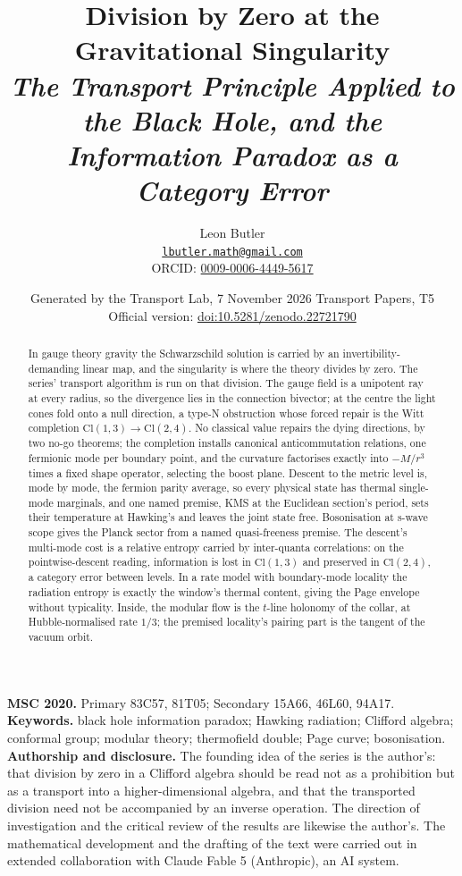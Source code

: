 \documentclass[11pt]{article}
\title{\bfseries Division by Zero at the Gravitational Singularity\\[4pt]\large\itshape The Transport Principle Applied to the Black Hole, and the Information Paradox as a Category Error}
\author{Leon Butler\\ \normalsize\href{mailto:lbutler.math@gmail.com}{\texttt{lbutler.math@gmail.com}}\\ \normalsize ORCID: \href{https://orcid.org/0009-0006-4449-5617}{0009-0006-4449-5617}}
\date{Generated by the Transport Lab, 7 November 2026 \textperiodcentered{} Transport Papers, T5\\[3pt]\small Official version: \href{https://doi.org/10.5281/zenodo.22721790}{doi:10.5281/zenodo.22721790}}
\theoremstyle{definition}
\theoremstyle{plain}
\providecommand{\Cl}{}\renewcommand{\Cl}{\mathrm{Cl}}
\begin{document}
\maketitle
\begin{abstract}
\normalsize
In gauge theory gravity the Schwarzschild solution is carried by an invertibility-demanding linear map, and the singularity is where the theory divides by zero. The series' transport algorithm is run on that division. The gauge field is a unipotent ray at every radius, so the divergence lies in the connection bivector; at the centre the light cones fold onto a null direction, a type-N obstruction whose forced repair is the Witt completion $\Cl(1,3) \to \Cl(2,4)$. No classical value repairs the dying directions, by two no-go theorems; the completion installs canonical anticommutation relations, one fermionic mode per boundary point, and the curvature factorises exactly into $-M/r^3$ times a fixed shape operator, selecting the boost plane. Descent to the metric level is, mode by mode, the fermion parity average, so every physical state has thermal single-mode marginals, and one named premise, KMS at the Euclidean section's period, sets their temperature at Hawking's and leaves the joint state free. Bosonisation at s-wave scope gives the Planck sector from a named quasi-freeness premise. The descent's multi-mode cost is a relative entropy carried by inter-quanta correlations: on the pointwise-descent reading, information is lost in $\Cl(1,3)$ and preserved in $\Cl(2,4)$, a category error between levels. In a rate model with boundary-mode locality the radiation entropy is exactly the window's thermal content, giving the Page envelope without typicality. Inside, the modular flow is the $t$-line holonomy of the collar, at Hubble-normalised rate $1/3$; the premised locality's pairing part is the tangent of the vacuum orbit.
\end{abstract}
\medskip
\noindent\textbf{MSC 2020.} Primary 83C57, 81T05; Secondary 15A66, 46L60, 94A17.\\
\textbf{Keywords.} black hole information paradox; Hawking radiation; Clifford algebra; conformal group; modular theory; thermofield double; Page curve; bosonisation.
\newpage
\noindent \textbf{Authorship and disclosure. }The founding idea of the series is the author's: that division by zero in a Clifford algebra should be read not as a prohibition but as a transport into a higher-dimensional algebra, and that the transported division need not be accompanied by an inverse operation. The direction of investigation and the critical review of the results are likewise the author's. The mathematical development and the drafting of the text were carried out in extended collaboration with Claude Fable 5 (Anthropic), an AI system.
\end{document}
